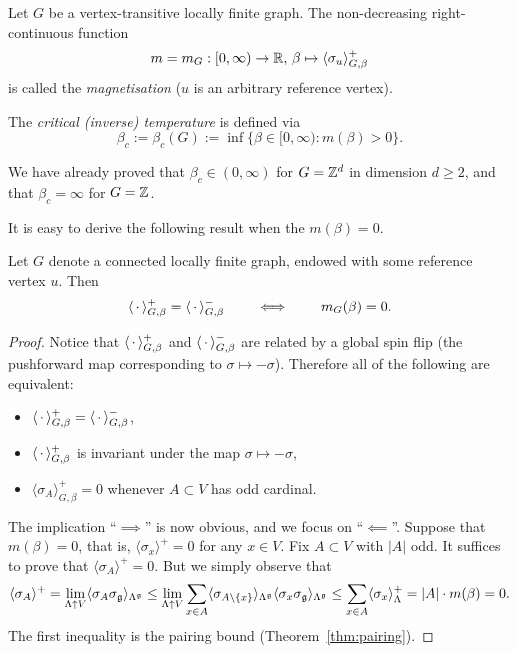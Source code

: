 \begin{definition}
    Let $G$ be a vertex-transitive locally finite graph.
    The non-decreasing right-continuous function
    \[
        m=m_G:[0,\infty)\to\mathbb R,\,\beta\mapsto\langle\sigma_u\rangle_{G,\beta}^+
    \]
    is called the \emph{magnetisation} ($u$ is an arbitrary reference vertex).

    The \emph{critical (inverse) temperature} is defined via
    \[
        \beta_c:=\beta_c(G):=\inf\{\beta\in[0,\infty):m(\beta)>0\}.
    \]
\end{definition}

We have already proved that $\beta_c\in(0,\infty)$ for $G=\mathbb Z^d$
in dimension $d\geq 2$,
and that $\beta_c=\infty$ for $G=\mathbb Z$.

It is easy to derive the following result when the $m(\beta)=0$.

\begin{theorem}
    \label{thm:vanishing_magnetisation}
    Let $G$ denote a connected locally finite graph,
    endowed with some reference vertex $u$.
    Then
    \[
        \langle\,\cdot\,\rangle_{G,\beta}^+=\langle\,\cdot\,\rangle_{G,\beta}^-
        \qquad
        \iff
        \qquad
        m_G(\beta)=0.
    \]
\end{theorem}

\begin{proof}
    Notice that $\langle\,\cdot\,\rangle_{G,\beta}^+$ and $\langle\,\cdot\,\rangle_{G,\beta}^-$
    are related
    by a global spin flip (the pushforward map corresponding to $\sigma\mapsto-\sigma$).
    Therefore all of the following are equivalent:
    \begin{itemize}
        \item $\langle\,\cdot\,\rangle_{G,\beta}^+=\langle\,\cdot\,\rangle_{G,\beta}^-$,
        \item $\langle\,\cdot\,\rangle_{G,\beta}^+$ is invariant under the map $\sigma\mapsto-\sigma$,
        \item $\langle\sigma_A\rangle_{G,\beta}^+=0$ whenever $A\subset V$ has odd cardinal.
    \end{itemize}

    The implication ``$\implies$'' is now obvious, and we focus on  ``$\impliedby$''.
    Suppose that $m(\beta)=0$,
    that is, $\langle\sigma_x\rangle^+=0$ for any $x\in V$.
    Fix $A\subset V$ with $|A|$ odd.
    It suffices to prove that $\langle\sigma_A\rangle^+=0$.
    But we simply observe that
    \[
        \langle\sigma_A\rangle^+
        =
        \lim_{\Lambda\uparrow V}
        \langle\sigma_A\sigma_\mathfrak g\rangle_{\Lambda^\mathfrak g}
        \leq
        \lim_{\Lambda\uparrow V}
        \sum_{x\in A}
        \langle\sigma_{A\setminus\{x\}}\rangle_{\Lambda^\mathfrak g}
        \langle\sigma_x\sigma_\mathfrak g\rangle_{\Lambda^\mathfrak g}
        \leq
        \sum_{x\in A}
        \langle\sigma_x\rangle_{\Lambda}^+= |A|\cdot m(\beta)=0.
    \]
    The first inequality is the pairing bound (Theorem~\ref{thm:pairing}).
\end{proof}

